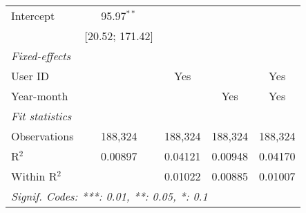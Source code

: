 \begin{table}[htbp]
\begin{threeparttable}[b]
\begin{tabular}{lcccc}
         Intercept                         & 95.97$^{**}$      &                   &                   &   \\   
                                           & [20.52; 171.42]   &                   &                   &   \\   
         \midrule
         \emph{Fixed-effects}\\
         User ID                           &                   & Yes               &                   & Yes\\  
         Year-month                        &                   &                   & Yes               & Yes\\  
         \midrule
         \emph{Fit statistics}\\
         Observations                      & 188,324           & 188,324           & 188,324           & 188,324\\  
         R$^2$                             & 0.00897           & 0.04121           & 0.00948           & 0.04170\\  
         Within R$^2$                      &                   & 0.01022           & 0.00885           & 0.01007\\  
         \midrule \midrule
         \multicolumn{5}{l}{\emph{Signif. Codes: ***: 0.01, **: 0.05, *: 0.1}}\\
      \end{tabular}
   \end{threeparttable}
\end{table}


